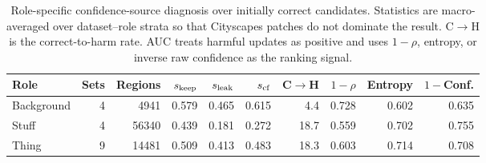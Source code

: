 \begin{table}[t]
\centering
\footnotesize
\setlength{\tabcolsep}{3.4pt}
\caption{Role-specific confidence-source diagnosis over initially correct candidates. Statistics are macro-averaged over dataset--role strata so that Cityscapes patches do not dominate the result. C$\rightarrow$H is the correct-to-harm rate. AUC treats harmful updates as positive and uses $1-\rho$, entropy, or inverse raw confidence as the ranking signal.}
\label{tab:role-source-diagnosis}
\begin{tabular}{lrrrrrrrrr}
\toprule
Role & Sets & Regions & $s_{\rm keep}$ & $s_{\rm leak}$ & $s_{\rm cf}$ & C$\rightarrow$H & $1-\rho$ & Entropy & $1-$Conf. \\
\midrule
Background & 4 & 4941 & 0.579 & 0.465 & 0.615 & 4.4 & 0.728 & 0.602 & 0.635 \\
Stuff & 4 & 56340 & 0.439 & 0.181 & 0.272 & 18.7 & 0.559 & 0.702 & 0.755 \\
Thing & 9 & 14481 & 0.509 & 0.413 & 0.483 & 18.3 & 0.603 & 0.714 & 0.708 \\
\bottomrule
\end{tabular}
\end{table}
